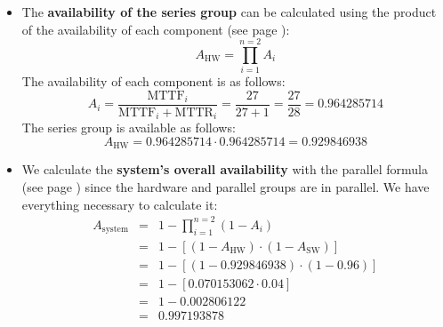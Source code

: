 \begin{enumerate}
\begin{center}
    \end{center}
    \begin{itemize}
        \item The \textbf{availability of the series group} can be calculated using the product of the availability of each component (see page \pageref{eq: Availability of Series System}):
        \begin{equation*}
            A_{\text{HW}} = \displaystyle\prod_{i=1}^{n=2} A_{i}
        \end{equation*}
        The availability of each component is as follows:
        \begin{equation*}
            A_{i} = \dfrac{\text{MTTF}_{i}}{\text{MTTF}_{i} + \text{MTTR}_{i}} = \dfrac{27}{27 + 1} = \dfrac{27}{28} = 0.964285714
        \end{equation*}
        The series group is available as follows:
        \begin{equation*}
            A_{\text{HW}} = 0.964285714 \cdot 0.964285714 = 0.929846938
        \end{equation*}

        \item We calculate the \textbf{system's overall availability} with the parallel formula (see page \pageref{eq: Availability of Parallel System - Simplified}) since the hardware and parallel groups are in parallel. We have everything necessary to calculate it:
        \begin{equation*}
            \begin{array}{rcl}
                A_{\text{system}} &=& 1 - \displaystyle\prod_{i=1}^{n=2} \left(1-A_{i}\right) \\ [1.5em]
                &=& 1 - \left[
                    \left(1 - A_{\text{HW}}\right)
                    \cdot
                    \left(1 - A_{\text{SW}}\right)
                \right] \\ [.5em]
                &=& 1 - \left[
                    \left(1 - 0.929846938\right)
                    \cdot
                    \left(1 - 0.96\right)
                \right] \\ [.5em]
                &=& 1 - \left[
                    0.070153062 \cdot 0.04
                \right] \\ [.5em]
                &=& 1 - 0.002806122 \\ [.5em]
                &=& \mathbf{0.99719}3878
            \end{array}
        \end{equation*}
    \end{itemize}


\end{enumerate}
